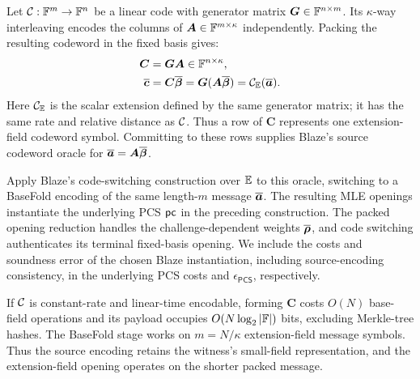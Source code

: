 Let \({\mathcal{C}}:{\mathbb{F}}^m\to{\mathbb{F}}^n\) be a linear code with
generator matrix \(\bm G\in{\mathbb{F}}^{n\times m}\).
Its \(\kappa\)-way interleaving encodes the columns of
\(\bm A\in{\mathbb{F}}^{m\times\kappa}\) independently.
Packing the resulting codeword in the fixed basis gives:
\begin{equation}
\begin{aligned}
    \bm C&=\bm G\bm A\in{\mathbb{F}}^{n\times\kappa},\\
    \overline{\bm c}&=\bm C\overline{\bm\beta}
       =\bm G(\bm A\overline{\bm\beta})
       ={\mathcal{C}}_{\mathbb{E}}(\overline{\bm a}).
\end{aligned}
\label{eq:pcs-code-packing}
\end{equation}
Here \({\mathcal{C}}_{\mathbb{E}}\) is the scalar extension defined
by the same generator matrix; it has the same rate and relative
distance as \({\mathcal{C}}\).
Thus a row of \(\bm C\) represents one extension-field codeword
symbol. Committing to these rows supplies Blaze's source codeword
oracle for \(\overline{\bm a}=\bm A\overline{\bm\beta}\).

Apply Blaze's code-switching construction over \(\mathbb{E}\)
to this oracle, switching to a BaseFold encoding of the same
length-\(m\) message \(\overline{\bm a}\).
The resulting MLE openings instantiate the underlying PCS \({\sf pc}\)
in the preceding construction.
The packed opening reduction handles the challenge-dependent weights
\(\overline{\bm\rho}\), and code switching authenticates its terminal
fixed-basis opening. We include the costs and soundness error of
the chosen Blaze instantiation, including source-encoding
consistency, in the underlying PCS costs and
\(\epsilon_{\mathsf{PCS}}\), respectively.

If \({\mathcal{C}}\) is constant-rate and linear-time encodable, forming
\(\bm C\) costs \(O(N)\) base-field operations and its payload
occupies \(O(N\log_2|{\mathbb{F}}|)\) bits, excluding Merkle-tree hashes.
The BaseFold stage works on \(m=N/\kappa\) extension-field message
symbols. Thus the source encoding retains the witness's small-field
representation, and the extension-field opening operates on the
shorter packed message.
